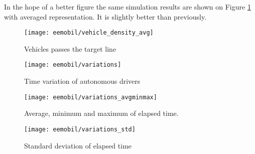 		In the hope of a better figure the same simulation results are shown on Figure \ref{fig:vehicle_density_avg} with averaged representation. It is slightly better than previously.
		\begin{figure}[ht]
			\centering
			\texttt{[image: eemobil/vehicle\_density\_avg]}
			\caption{Vehicles passes the target line}
			\label{fig:vehicle_density_avg}
		\end{figure}
		\begin{figure}
			\centering
			\texttt{[image: eemobil/variations]}
			\caption{Time variation of autonomous drivers}
			\label{fig:self_variations}
		\end{figure}
		\begin{figure}
			\centering
			\texttt{[image: eemobil/variations\_avgminmax]}
			\caption{Average, minimum and maximum of elapsed time.}
			\label{fig:self_variations_avgminmax}
		\end{figure}
		\begin{figure}
			\centering
			\texttt{[image: eemobil/variations\_std]}
			\caption{Standard deviation of elapsed time}
			\label{fig:self_variations_std}
		\end{figure}
